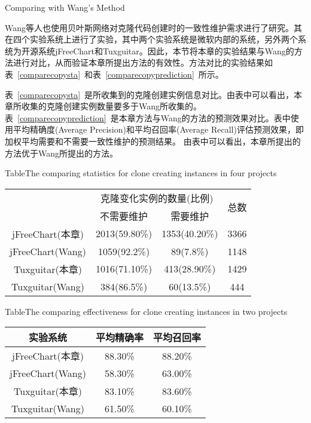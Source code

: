 {Comparing with Wang’s Method}

Wang\cite{wang2014predicting}等人也使用贝叶斯网络对克隆代码创建时的一致性维护需求进行了研究。其在四个实验系统上进行了实验，其中两个实验系统是微软内部的系统，另外两个系统为开源系统jFreeChart和Tuxguitar。因此，本节将本章的实验结果与Wang的方法进行对比，从而验证本章所提出方法的有效性。方法对比的实验结果如表~\ref{comparecopysta}~和表~\ref{comparecopyprediction}~所示。

表~\ref{comparecopysta}~是所收集到的克隆创建实例信息对比。由表中可以看出，本章所收集的克隆创建实例数量要多于Wang所收集的。
表~\ref{comparecopyprediction}~是本章方法与Wang的方法的预测效果对比。表中使用平均精确度(Average Precision)和平均召回率(Average Recall)评估预测效果，即加权平均需要和不需要一致性维护的预测结果。
由表中可以看出，本章所提出的方法优于Wang所提出的方法。

\begin{table}[htbp]
{Table$\!$}{The comparing statistics for clone creating instances in four projects}
\vspace{0.5em}
\centering
\wuhao
\begin{tabular}{cccc}
\toprule[1.5pt]
~\multirow{2}{*}{实验系统}& \multicolumn{2}{c}{克隆变化实例的数量(比例)} & \multirow{2}{*}{总数}\\ 
 \cline{2-3}
~&{不需要维护} &{需要维护} & ~\\
\midrule[1pt]
jFreeChart(本章)&	2013(59.80\%)&	1353(40.20\%)&	3366\\
jFreeChart(Wang)&1059(92.2\%)&	89(7.8\%)&	1148\\
Tuxguitar(本章)&	1016(71.10\%)&	413(28.90\%)&	1429\\
Tuxguitar(Wang)&384(86.5\%)&	60(13.5\%)&	444\\
\bottomrule[1.5pt]
\end{tabular}
\end{table}

\begin{table}[htbp]
{Table$\!$}{The comparing effectiveness for clone creating instances in two projects}
\vspace{0.5em}
\centering
\wuhao
\begin{tabular}{ccc}
\toprule[1.5pt]
{实验系统}&{平均精确率} &{平均召回率}\\ 
\midrule[1pt]
jFreeChart(本章)&	88.30\%& 88.20\%\\
jFreeChart(Wang)&58.30\%&	63.00\%\\
Tuxguitar(本章)&	83.10\%&	83.60\%\\
Tuxguitar(Wang)&61.50\%&	60.10\%\\
\bottomrule[1.5pt]
\end{tabular}
\end{table}

